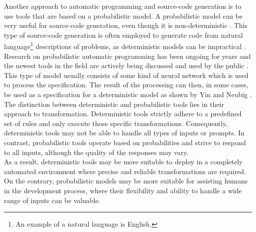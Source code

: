 Another approach to automatic programming and source-code generation is to use tools that are based on a probabilistic model.
A probabilistic model can be very useful for source-code generation, even though it is non-deterministic \cite{chenEvaluatingLargeLanguage2021}.
This type of source-code generation is often employed to generate code from natural language\footnote{
    An example of a natural language is English.
}
descriptions of problems, as deterministic models can be impractical \cite{alonStructuralLanguageModels2020}.
Research on probabilistic automatic programming has been ongoing for years and the newest tools in the field are actively being discussed and used by the public \cite{zdnetWhatChatGPTWhy, johnmaedaChoosingLLMModel2023}.
This type of model usually consists of some kind of neural network which is used to process the specification. 
The result of the processing can then, in some cases, be used as a specification for a deterministic model as shown by Yin and Neubig \cite{yinSyntacticNeuralModel2017}.\\
The distinction between deterministic and probabilistic tools lies in their approach to transformation. Deterministic tools strictly adhere to a predefined set of rules and only execute those specific transformations. Consequently, deterministic tools may not be able to handle all types of inputs or prompts.
In contrast, probabilistic tools operate based on probabilities and strive to respond to all inputs, although the quality of the responses may vary.\\
As a result, deterministic tools may be more suitable to deploy in a completely automated environment where precise and reliable transformations are required.
On the contrary, probabilistic models may be more suitable for assisting humans in the development process, where their flexibility and ability to handle a wide range of inputs can be valuable.